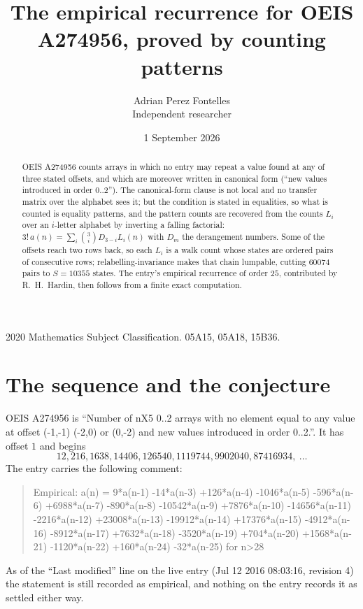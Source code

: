 \documentclass[11pt,a4paper]{article}
\title{The empirical recurrence for OEIS A274956, proved by counting patterns}
\author{Adrian Perez Fontelles\\ \small Independent researcher}
\date{1 September 2026}
\theoremstyle{plain}
\theoremstyle{definition}
\begin{document}
\maketitle

\begin{abstract}
OEIS A274956 counts arrays in which no entry may repeat a value found at any of three stated
offsets, and which are moreover written in canonical form (``new values introduced in order
$0..2$''). The canonical-form clause is not local and no transfer matrix over the
alphabet sees it; but the condition is stated in equalities, so what is counted is equality
patterns, and the pattern counts are recovered from the counts $L_i$ over an $i$-letter
alphabet by inverting a falling factorial:
$3!\,a(n)=\sum_i\binom{3}{i}D_{3-i}L_i(n)$ with $D_m$ the derangement numbers.
Some of the offsets reach two rows back, so each $L_i$ is a walk count whose states are
ordered pairs of consecutive rows; relabelling-invariance makes that chain lumpable,
cutting $60074$ pairs to $S=10355$ states. The entry's empirical recurrence of order $25$,
contributed by R.~H.~Hardin, then follows from a finite exact computation.
\end{abstract}

\noindent\small 2020 Mathematics Subject Classification. 05A15, 05A18, 15B36.\normalsize

\section{The sequence and the conjecture}

OEIS A274956 is ``Number of nX5 0..2 arrays with no element equal to any value at offset (-1,-1) (-2,0) or (0,-2) and new values introduced in order 0..2.''. It has offset $1$ and begins
\[
12, 216, 1638, 14406, 126540, 1119744, 9902040, 87416934,\ \dots
\]
The entry carries the following comment:
\begin{quote}\small
Empirical: a(n) = 9*a(n-1) -14*a(n-3) +126*a(n-4) -1046*a(n-5) -596*a(n-6) +6988*a(n-7) -890*a(n-8) -10542*a(n-9) +7876*a(n-10) -14656*a(n-11) -2216*a(n-12) +23008*a(n-13) -19912*a(n-14) +17376*a(n-15) -4912*a(n-16) -8912*a(n-17) +7632*a(n-18) -3520*a(n-19) +704*a(n-20) +1568*a(n-21) -1120*a(n-22) +160*a(n-24) -32*a(n-25) for n>28
\end{quote}
As of the ``Last modified'' line on the live entry (Jul 12 2016 08:03:16, revision 4) the statement is
still recorded as empirical, and nothing on the entry records it as settled either way.
\end{document}
